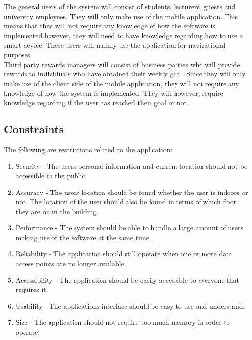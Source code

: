 \documentclass[11pt, a4paper]{article}
\begin{document}
	The general users of the system will consist of students,  lecturers,  guests and university employees. They will only make use of the mobile application. This means that they will not require any knowledge of how the software is implemented however,  they will need to have knowledge regarding how to use a smart device. These users will mainly use the application for navigational purposes.
	\\

	Third party rewards managers will consist of business parties who will provide rewards to individuals who have obtained their weekly goal. Since they will only make use of the client side of the mobile application, they will not require any knowledge of how the system is implemented. They will however, require knowledge regarding if the user has reached their goal or not.

	\subsection{Constraints}
	The following are restrictions related to the application:
		\begin{enumerate}
				\renewcommand{\labelenumi}{{\textbf{\arabic{enumi}.}}}
				\item Security  - The users personal information and current location should not be accessible to the public.
				\item Accuracy - The users location should be found whether the user is indoors or not. The location of the user should also be found in terms of which floor they are on in the building.
				\item Performance - The system should be able to handle a large amount of users making use of the software at the same time.
				\item Reliability - The application should still operate when one or more data access points are no longer available.
				\item Accessibility - The application should be easily accessible to everyone that requires it.
				\item Usability - The applications interface should be easy to use and understand.
				\item Size - The application should not require too much memory in order to operate.
				\end{enumerate}
\end{document}
